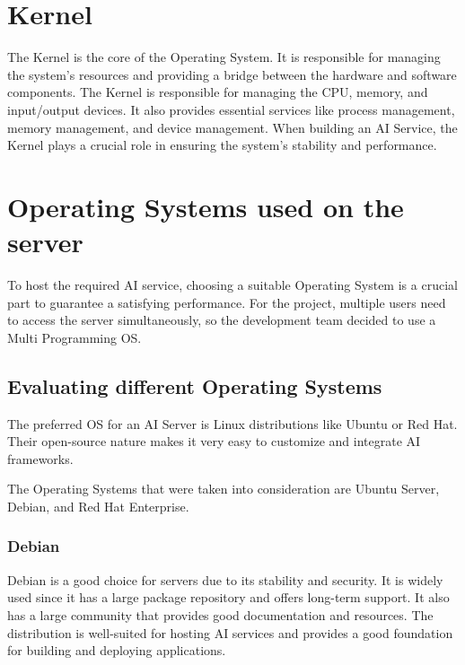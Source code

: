 \cite{TypesOfOs}

\section {Kernel}

The Kernel is the core of the Operating System. It is responsible for managing the system's resources and providing a bridge between the hardware and software components. The Kernel is responsible for managing the CPU, memory, and input/output devices. It also provides essential services like process management, memory management, and device management.
When building an AI Service, the Kernel plays a crucial role in ensuring the system's stability and performance.

\cite{Kernel}

\section {Operating Systems used on the server}

To host the required AI service, choosing a suitable Operating System is a crucial part to guarantee a satisfying performance.
For the project, multiple users need to access the server simultaneously, so the development team decided to use a Multi Programming OS.

\subsection {Evaluating different Operating Systems}

The preferred OS for an AI Server is Linux distributions like Ubuntu or Red Hat.
Their open-source nature makes it very easy to customize and integrate AI frameworks.

The Operating Systems that were taken into consideration are Ubuntu Server, Debian, and Red Hat Enterprise. 

\cite{LinuxPoweredAi}

\subsubsection{Debian}

Debian is a good choice for servers due to its stability and security. It is widely used since it has a large package repository and offers long-term support. It also has a large community that provides good documentation and resources. The distribution is well-suited for hosting AI services and provides a good foundation for building and deploying applications.

